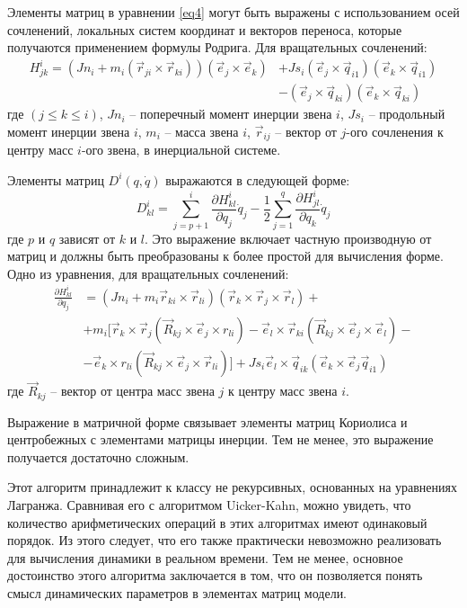 Элементы матриц в уравнении \ref{eq4} могут быть выражены с использованием осей сочленений, локальных систем координат и векторов переноса, которые получаются применением формулы Родрига. Для вращательных сочленений:
\begin{align*}
H_{jk}^i = 
(Jn_i + m_i (\vec r_{ji} \times \vec r_{ki})) (\vec e_j \times \vec e_k)
&+ Js_i (\vec e_j \times \vec q_{i1}) (\vec e_k \times \vec q_{i1})
\\&- (\vec e_j  \times \vec q_{ki}) (\vec e_k \times \vec q_{ki})
\end{align*}
где $(j \le k \le i)$, $Jn_i$ -- поперечный момент инерции звена $i$, $Js_i$ -- продольный момент инерции звена $i$, $m_i$ -- масса звена $i$, $\vec r_{ij}$ -- вектор от $j$-ого сочленения к центру масс $i$-ого звена, в инерциальной системе.

Элементы матриц $D^i (q, \dot q)$ выражаются в следующей форме:
\begin{equation}
D_{kl}^i = 
\sum_{j=p+1}^{i}
\frac{\partial H_{kl}^i}{\partial q_j} \dot q_j - 
\frac{1}{2} \sum_{j=1}^{q}
\frac{\partial H_{jl}^i}{\partial q_k} \dot q_j
\end{equation}
где $p$ и $q$ зависят от $k$ и $l$. Это выражение включает частную производную от матриц и должны быть преобразованы к более простой для вычисления форме. Одно из уравнения, для вращательных сочленений:
\begin{align*}
\frac{\partial H_{kl}^i}{\partial q_j} &= 
(Jn_i + m_i \vec r_{ki} \times \vec r_{li})(\vec r_{k} \times \vec r_{j} \times \vec r_{l})+\\
& +m_i [\vec r_{k} \times \vec r_{j} (\vec R_{kj} \times \vec e_j \times r_{li})
- \vec e_l \times \vec r_{ki} (\vec R_{kj} \times \vec e_j \times \vec e_l) -\\
&- \vec e_k \times r_{li} (\vec R_{kj} \times \vec e_j \times \vec r_{li})] 
+ Js_i \vec e_l \times \vec q_{ik} (\vec e_k \times \vec e_j \vec q_{i1})
\end{align*}
где $\vec R_{kj}$ -- вектор от центра масс звена $j$ к центру масс звена $i$.

Выражение в матричной форме связывает элементы матриц Кориолиса и центробежных с элементами матрицы инерции. Тем не менее, это выражение получается достаточно сложным. 

Этот алгоритм принадлежит к классу не рекурсивных, основанных на уравнениях Лагранжа. Сравнивая его с алгоритмом Uicker-Kahn, можно увидеть, что количество арифметических операций в этих алгоритмах имеют одинаковый порядок. Из этого следует, что его также практически невозможно реализовать для вычисления динамики в реальном времени. Тем не менее, основное достоинство этого алгоритма заключается в том, что он позволяется понять смысл динамических параметров в элементах матриц модели.

